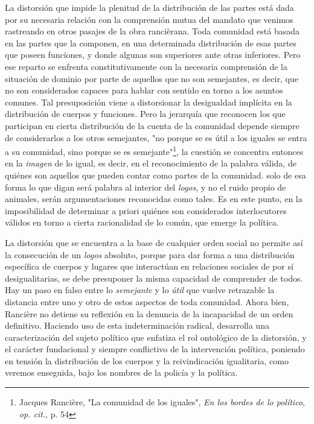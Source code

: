 \documentclass{book}
\begin{document}
La distorsión que impide la plenitud de la distribución de las partes
está dada por su necesaria relación con la comprensión mutua del mandato
que venimos rastreando en otros pasajes de la obra rancièrana. Toda
comunidad está basada en las partes que la componen, en una determinada
distribución de esas partes que poseen funciones, y donde algunas son
superiores ante otras inferiores. Pero ese reparto se enfrenta
constitutivamente con la necesaria comprensión de la situación de
dominio por parte de aquellos que no son semejantes, es decir, que no
son considerados capaces para hablar con sentido en torno a los asuntos
comunes. Tal presuposición viene a distorsionar la desigualdad implícita
en la distribución de cuerpos y funciones. Pero la jerarquía que
reconocen los que participan en cierta distribución de la cuenta de la
comunidad depende siempre de considerarlos a los otros semejantes, "no
porque se es útil a los iguales se entra a su comunidad, sino porque se
es semejante"\footnote{Jacques Rancière, "La comunidad de los iguales",
  \emph{En los bordes de lo político}, \emph{op. cit.}, p. 54}, la
cuestión se concentra entonces en la \emph{imagen} de lo igual, es
decir, en el reconocimiento de la palabra válida, de quiénes son
aquellos que pueden contar como partes de la comunidad. solo de esa
forma lo que digan será palabra al interior del \emph{logos}, y no el
ruido propio de animales, serán argumentaciones reconocidas como tales.
Es en este punto, en la imposibilidad de determinar a priori quiénes son
considerados interlocutores válidos en torno a cierta racionalidad de lo
común, que emerge la política.

La distorsión que se encuentra a la base de cualquier orden social no
permite así la consecución de un \emph{logos} absoluto, porque para dar
forma a una distribución específica de cuerpos y lugares que interactúan
en relaciones sociales de por sí desigualitarias, se debe presuponer la
misma capacidad de comprender de todos. Hay un paso en falso entre lo
\emph{semejante} y lo \emph{útil} que vuelve retrazable la distancia
entre uno y otro de estos aspectos de toda comunidad. Ahora bien,
Rancière no detiene su reflexión en la denuncia de la incapacidad de un
orden definitivo. Haciendo uso de esta indeterminación radical,
desarrolla una caracterización del sujeto político que enfatiza el rol
ontológico de la distorsión, y el carácter fundacional y siempre
conflictivo de la intervención política, poniendo en tensión la
distribución de los cuerpos y la reivindicación igualitaria, como
veremos enseguida, bajo los nombres de la policía y la política.
\end{document}
